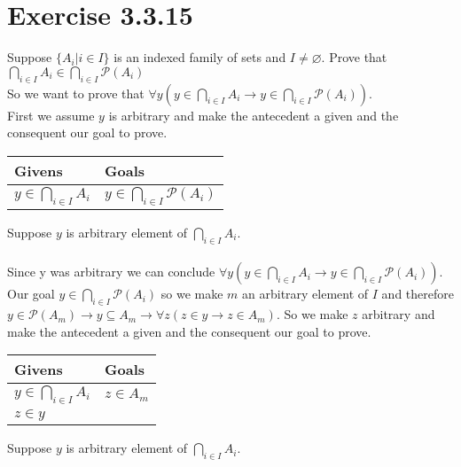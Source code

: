 \documentclass{article}
\newcommand{\n}{ \noindent }
\newcommand{\pwset}{\mathscr{P}}
\begin{document}
\section*{Exercise 3.3.15}
Suppose $ \{ A_i | i \in I \}$ is an indexed family of sets and $ I \neq \varnothing$. Prove that $\bigcap_{i \in I} A_i \in \bigcap_{i \in I} \pwset(A_i)$ \\

\n So we want to prove that $\forall y (y \in \bigcap_{i \in I} A_i \rightarrow y \in \bigcap_{i \in I} \pwset(A_i))$. \\

\n First we assume $y$ is arbitrary and make the antecedent a given and the consequent our goal to prove. \\

\begin{table}[h]
\begin{tabular}{ll}
\hline
Givens & Goals   \\ \hline
$y \in \bigcap_{i \in I} A_i$ & $y \in \bigcap_{i \in I} \pwset(A_i)$   \\ \hline
\end{tabular}
\end{table}

\n Suppose $y$ is arbitrary element of $\bigcap_{i \in I} A_i$. \\
\indent [proof of $y \in \bigcap_{i \in I} \pwset(A_i)$] \\
\n Since y was arbitrary we can conclude $\forall y (y \in \bigcap_{i \in I} A_i \rightarrow y \in \bigcap_{i \in I} \pwset(A_i))$. \\

\n Our goal $y \in \bigcap_{i \in I} \pwset(A_i)$ so we make $m$ an arbitrary element of $I$ and therefore $y \in \pwset(A_m) \rightarrow y \subseteq A_m \rightarrow \forall z (z \in y \rightarrow z \in A_m)$. So we make $z$ arbitrary and make the antecedent a given and the consequent our goal to prove. \\


\begin{table}[h]
\begin{tabular}{ll}
\hline
Givens & Goals   \\ \hline
$y \in \bigcap_{i \in I} A_i$ & $z \in A_m$   \\
$z \in y$ & \\ \hline
\end{tabular}
\end{table}

\n Suppose $y$ is arbitrary element of $\bigcap_{i \in I} A_i$.
\end{document}
